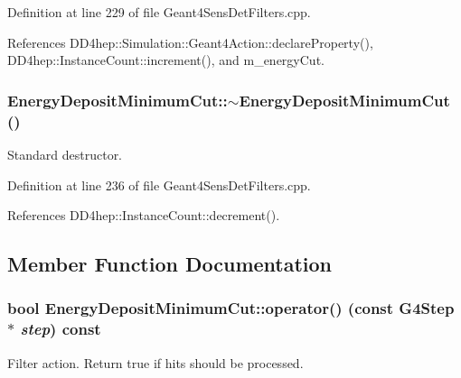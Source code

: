 Definition at line 229 of file Geant4SensDetFilters.cpp.

References DD4hep::Simulation::Geant4Action::declareProperty(), DD4hep::InstanceCount::increment(), and m\_\-energyCut.\hypertarget{struct_d_d4hep_1_1_simulation_1_1_energy_deposit_minimum_cut_a808a2e16dfa18be72f189409484fe50d}{
\subsubsection[{$\sim$EnergyDepositMinimumCut}]{\setlength{\rightskip}{0pt plus 5cm}EnergyDepositMinimumCut::$\sim$EnergyDepositMinimumCut ()}}
\label{struct_d_d4hep_1_1_simulation_1_1_energy_deposit_minimum_cut_a808a2e16dfa18be72f189409484fe50d}


Standard destructor. 

Definition at line 236 of file Geant4SensDetFilters.cpp.

References DD4hep::InstanceCount::decrement().

\subsection{Member Function Documentation}
\hypertarget{struct_d_d4hep_1_1_simulation_1_1_energy_deposit_minimum_cut_a1ab9fdb187f848cbf70d15871188fe94}{
\subsubsection[{operator()}]{\setlength{\rightskip}{0pt plus 5cm}bool EnergyDepositMinimumCut::operator() (const G4Step $\ast$ {\em step}) const}}
\label{struct_d_d4hep_1_1_simulation_1_1_energy_deposit_minimum_cut_a1ab9fdb187f848cbf70d15871188fe94}


Filter action. Return true if hits should be processed. 

